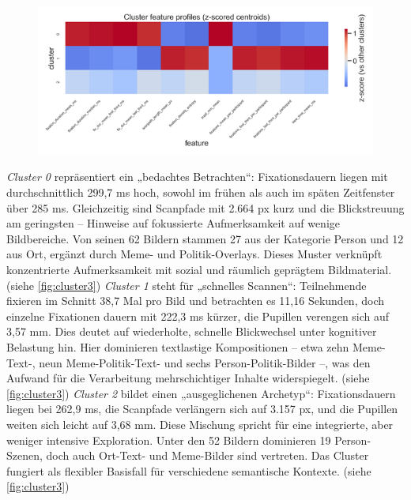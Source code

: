 \documentclass[
    language=german, %
    thesis=seminar, %
    supervisor=postdoc, %
    multiauthor=true, %
    ]{settings/csssa-thesis}
\begin{document}
 \begin{figure}[h]
    \centering
    \includegraphics[width=\linewidth,height=0.8\textheight,keepaspectratio]{figures/Abb 2.png}
    \caption{}
    \label{fig:cluster2}
\end{figure}

\textit{Cluster 0} repräsentiert ein „bedachtes Betrachten“: Fixationsdauern liegen mit durchschnittlich 299,7 ms hoch, sowohl im frühen als auch im späten Zeitfenster über 285 ms. Gleichzeitig sind Scanpfade mit 2.664 px kurz und die Blickstreuung am geringsten – Hinweise auf fokussierte Aufmerksamkeit auf wenige Bildbereiche. Von seinen 62 Bildern stammen 27 aus der Kategorie Person und 12 aus Ort, ergänzt durch Meme- und Politik-Overlays. Dieses Muster verknüpft konzentrierte Aufmerksamkeit mit sozial und räumlich geprägtem Bildmaterial. (siehe \ref{fig:cluster3})
\textit{Cluster 1} steht für „schnelles Scannen“: Teilnehmende fixieren im Schnitt 38,7 Mal pro Bild und betrachten es 11,16 Sekunden, doch einzelne Fixationen dauern mit 222,3 ms kürzer, die Pupillen verengen sich auf 3,57 mm. Dies deutet auf wiederholte, schnelle Blickwechsel unter kognitiver Belastung hin. Hier dominieren textlastige Kompositionen – etwa zehn Meme-Text-, neun Meme-Politik-Text- und sechs Person-Politik-Bilder –, was den Aufwand für die Verarbeitung mehrschichtiger Inhalte widerspiegelt. (siehe \ref{fig:cluster3})
\textit{Cluster 2 } bildet einen „ausgeglichenen Archetyp“: Fixationsdauern liegen bei 262,9 ms, die Scanpfade verlängern sich auf 3.157 px, und die Pupillen weiten sich leicht auf 3,68 mm. Diese Mischung spricht für eine integrierte, aber weniger intensive Exploration. Unter den 52 Bildern dominieren 19 Person-Szenen, doch auch Ort-Text- und Meme-Bilder sind vertreten. Das Cluster fungiert als flexibler Basisfall für verschiedene semantische Kontexte. (siehe \ref{fig:cluster3})
\end{document}
